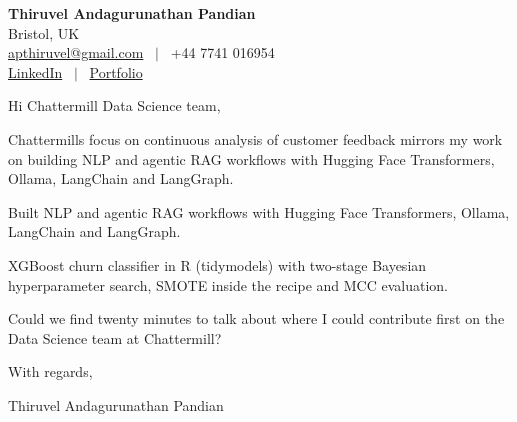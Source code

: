 \documentclass[11pt,a4paper]{article}
\begin{document}
\raggedright
\pagestyle{empty}

\begin{center}
    {\LARGE \color{linkblue} \textbf{Thiruvel Andagurunathan Pandian}}\\[0.2cm]
    Bristol, UK \\
    \href{mailto:apthiruvel@gmail.com}{apthiruvel@gmail.com} \ $|$ \ +44 7741 016954 \\
\href{https://www.linkedin.com/in/thiruvel-a-p/}{LinkedIn} \ $|$ \ \href{https://thiruvel-ap.github.io/PersonalPortfolio/}{Portfolio}
\end{center}

\vspace{0.4cm}

\noindent
Hi Chattermill Data Science team,

Chattermill\textquotesingle{}s focus on continuous analysis of customer feedback mirrors my work on building NLP and agentic RAG workflows with Hugging Face Transformers, Ollama, LangChain and LangGraph.

Built NLP and agentic RAG workflows with Hugging Face Transformers, Ollama, LangChain and LangGraph.

XGBoost churn classifier in R (tidymodels) with two-stage Bayesian hyperparameter search, SMOTE inside the recipe and MCC evaluation.

Could we find twenty minutes to talk about where I could contribute first on the Data Science team at Chattermill?

\vspace{0.5cm}

With regards,

Thiruvel Andagurunathan Pandian
\end{document}
